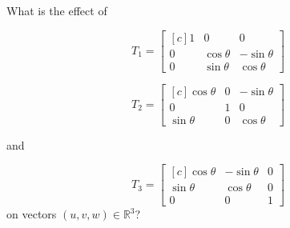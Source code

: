 \documentclass{amsart}
\begin{document}
{
What is the effect of 

\[
T_1 =
\begin{bmatrix*}[c]
1 & 0 &0 \\
0 & \cos \theta & -\sin \theta \\ 
0 & \sin \theta & \cos \theta 
\end{bmatrix*}
\]

\[
T_2 =
\begin{bmatrix*}[c]
\cos \theta & 0 & -\sin \theta \\ 
0 & 1 & 0 \\ 
\sin \theta &0  & \cos \theta 
\end{bmatrix*}
\]

and

\[
T_3 =
\begin{bmatrix*}[c]
 \cos \theta & -\sin \theta & 0 \\ 
\sin \theta & \cos \theta & 0 \\
0 & 0 & 1
\end{bmatrix*}
\]
on vectors $(u,v,w)\in\mathbb{R}^3$?

}
{
}
\end{document}
